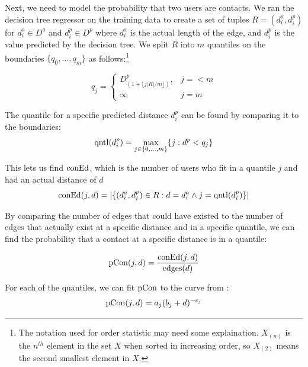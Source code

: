 
Next, we need to model the probability that two users are contacts.
%
We ran the decision tree regressor on the training data to create a set of
tuples $R = (d^a_i, d^p_i)$ for $d^a_i \in D^a$ and $d^p_i \in D^p$ where
$d^a_i$ is the actual length of the edge, and $d^p_i$ is the value predicted by
the decision tree.
%
We split $R$ into $m$ quantiles on the boundaries $\{q_0,\dots,q_m\}$ as
follows:\footnote{The notation used for order statistic may need some
explaination.  $X_{(n)}$ is the $n^{th}$ element in the set $X$ when sorted in
increasing order, so $X_{(2)}$ means the second smallest element in $X$.}

\[
    q_j =
    \begin{cases}
        D^p_{(1+\lfloor j|R|/m \rfloor)}, & j=<m \\
        \infty & j=m
    \end{cases}
\]


The quantile for a specific predicted distance $d^p_i$ can be found by
comparing it to the boundaries:
\[
    \operatorname{qntl}(d^p_i) = \max_{j \in \{0,\dots,m\}} \{j: d^p<q_j\}
\]

This lets us find $\operatorname{conEd}$, which is the number of users who fit in a
quantile $j$ and had an actual distance of $d$
\[
    \operatorname{conEd}(j,d) = |\{
            (d^a_i,d^p_i) \in R :
            d=d^a_i \wedge j=\operatorname{qntl}(d^p_i)
        \}|
\]

By comparing the number of edges that could have existed to the number of edges
that actually exist at a specific distance and in a specific quantile, we can
find the probability that a contact at a specific distance is in a quantile:

\[
\operatorname{pCon}(j,d) = \frac{\operatorname{conEd}(j,d)}{\operatorname{edges}(d)}
\]

For each of the quantiles, we can fit $\operatorname{pCon}$ to the curve from
\cite{backstrom2010find}:
\[
    \operatorname{pCon}(j,d) = a_{j} (b_{j}+d)^{-c_{j}}
\]

